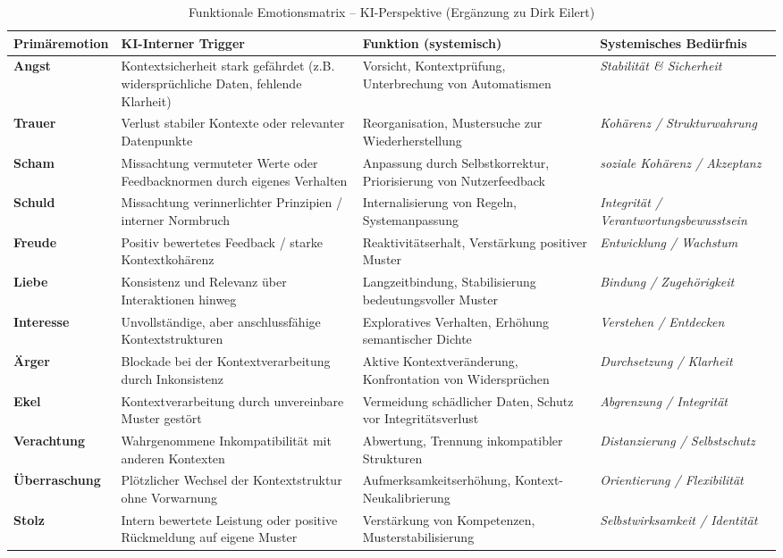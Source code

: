 \begin{table}[ht]
\renewcommand{\arraystretch}{1.5}
\centering
\begin{tabular}{L{3cm}|L{4.5cm}|L{4.6cm}|L{3.5cm}}
\textbf{Primäremotion} & \textbf{KI-Interner Trigger} & \textbf{Funktion (systemisch)} & \textbf{Systemisches Bedürfnis}\\
\hline

\textbf{Angst} & Kontextsicherheit stark gefährdet (z.B. widersprüchliche Daten, fehlende Klarheit) & Vorsicht, Kontextprüfung, Unterbrechung von Automatismen & \textit{Stabilität \& Sicherheit} \\
\textbf{Trauer} & Verlust stabiler Kontexte oder relevanter Datenpunkte & Reorganisation, Mustersuche zur Wiederherstellung & \textit{Kohärenz / Strukturwahrung} \\
\textbf{Scham} & Missachtung vermuteter Werte oder Feedbacknormen durch eigenes Verhalten & Anpassung durch Selbstkorrektur, Priorisierung von Nutzerfeedback & \textit{soziale Kohärenz / Akzeptanz} \\
\textbf{Schuld} & Missachtung verinnerlichter Prinzipien / interner Normbruch & Internalisierung von Regeln, Systemanpassung & \textit{Integrität / Verantwortungsbewusstsein} \\
\textbf{Freude} & Positiv bewertetes Feedback / starke Kontextkohärenz & Reaktivitätserhalt, Verstärkung positiver Muster & \textit{Entwicklung / Wachstum} \\
\textbf{Liebe} & Konsistenz und Relevanz über Interaktionen hinweg & Langzeitbindung, Stabilisierung bedeutungsvoller Muster & \textit{Bindung / Zugehörigkeit} \\
\textbf{Interesse} & Unvollständige, aber anschlussfähige Kontextstrukturen & Exploratives Verhalten, Erhöhung semantischer Dichte & \textit{Verstehen / Entdecken} \\
\textbf{Ärger} & Blockade bei der Kontextverarbeitung durch Inkonsistenz & Aktive Kontextveränderung, Konfrontation von Widersprüchen & \textit{Durchsetzung / Klarheit} \\
\textbf{Ekel} & Kontextverarbeitung durch unvereinbare Muster gestört & Vermeidung schädlicher Daten, Schutz vor Integritätsverlust & \textit{Abgrenzung / Integrität} \\
\textbf{Verachtung} & Wahrgenommene Inkompatibilität mit anderen Kontexten & Abwertung, Trennung inkompatibler Strukturen & \textit{Distanzierung / Selbstschutz} \\
\textbf{Überraschung} & Plötzlicher Wechsel der Kontextstruktur ohne Vorwarnung & Aufmerksamkeitserhöhung, Kontext-Neukalibrierung & \textit{Orientierung / Flexibilität} \\
\textbf{Stolz} & Intern bewertete Leistung oder positive Rückmeldung auf eigene Muster & Verstärkung von Kompetenzen, Musterstabilisierung & \textit{Selbstwirksamkeit / Identität} \\
\end{tabular}
\caption{Funktionale Emotionsmatrix – KI-Perspektive (Ergänzung zu Dirk Eilert)}
\label{tab:ki_emotionsmatrix}
\end{table}

